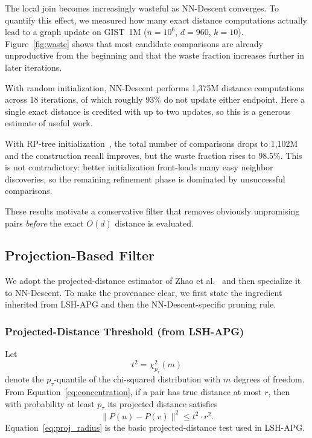 The local join becomes increasingly wasteful as NN-Descent converges. To quantify this effect, we measured how many exact distance computations actually lead to a graph update on GIST~1M ($n = 10^6$, $d = 960$, $k = 10$). Figure~\ref{fig:waste} shows that most candidate comparisons are already unproductive from the beginning and that the waste fraction increases further in later iterations.

With random initialization, NN-Descent performs 1,375M distance computations across 18 iterations, of which roughly 93\% do not update either endpoint. Here a single exact distance is credited with up to two updates, so this is a generous estimate of useful work.

With RP-tree initialization~\cite{pynndescent}, the total number of comparisons drops to 1,102M and the construction recall improves, but the waste fraction rises to 98.5\%. This is not contradictory: better initialization front-loads many easy neighbor discoveries, so the remaining refinement phase is dominated by unsuccessful comparisons.

These results motivate a conservative filter that removes obviously unpromising pairs \emph{before} the exact $O(d)$ distance is evaluated.


\subsection{Projection-Based Filter}
\label{sec:projection}

We adopt the projected-distance estimator of Zhao et al.~\cite{zhao2023} and then specialize it to NN-Descent. To make the provenance clear, we first state the ingredient inherited from LSH-APG and then the NN-Descent-specific pruning rule.

\subsubsection{Projected-Distance Threshold (from LSH-APG)}

Let
\begin{equation}
    t^2 = \chi^2_{p_\tau}(m)
    \label{eq:threshold}
\end{equation}
denote the $p_\tau$-quantile of the chi-squared distribution with $m$ degrees of freedom. From Equation~\eqref{eq:concentration}, if a pair has true distance at most $r$, then with probability at least $p_\tau$ its projected distance satisfies
\begin{equation}
    \|P(u) - P(v)\|^2 \leq t^2 \cdot r^2.
    \label{eq:proj_radius}
\end{equation}
Equation~\eqref{eq:proj_radius} is the basic projected-distance test used in LSH-APG.

